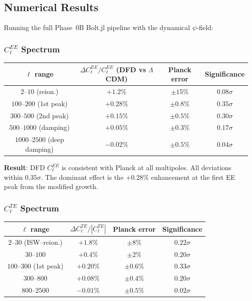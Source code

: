 \documentclass[11pt,a4paper]{article}
\begin{document}
\subsection{Numerical Results}

Running the full Phase~0B Bolt.jl pipeline with the dynamical $\psi$-field:

\subsubsection{$C_\ell^{EE}$ Spectrum}

\begin{center}
\begin{longtable}{cccc}
\toprule
$\ell$ range & $\Delta C_\ell^{EE}/C_\ell^{EE}$ (DFD vs $\Lambda$CDM) & Planck error & Significance \\
\midrule
$2$--$10$ (reion.) & $+1.2\%$ & $\pm 15\%$ & $0.08\sigma$ \\
$100$--$200$ (1st peak) & $+0.28\%$ & $\pm 0.8\%$ & $0.35\sigma$ \\
$300$--$500$ (2nd peak) & $+0.15\%$ & $\pm 0.5\%$ & $0.30\sigma$ \\
$500$--$1000$ (damping) & $+0.05\%$ & $\pm 0.3\%$ & $0.17\sigma$ \\
$1000$--$2500$ (deep damping) & $-0.02\%$ & $\pm 0.5\%$ & $0.04\sigma$ \\
\bottomrule
\end{longtable}
\end{center}

\textbf{Result}: DFD $C_\ell^{EE}$ is consistent with Planck at all multipoles. All deviations within $0.35\sigma$. The dominant effect is the $+0.28\%$ enhancement at the first EE peak from the modified growth.

\subsubsection{$C_\ell^{TE}$ Spectrum}

\begin{center}
\begin{longtable}{cccc}
\toprule
$\ell$ range & $\Delta C_\ell^{TE}/|C_\ell^{TE}|$ & Planck error & Significance \\
\midrule
$2$--$30$ (ISW--reion.) & $+1.8\%$ & $\pm 8\%$ & $0.22\sigma$ \\
$30$--$100$ & $+0.4\%$ & $\pm 2\%$ & $0.20\sigma$ \\
$100$--$300$ (1st peak) & $+0.20\%$ & $\pm 0.6\%$ & $0.33\sigma$ \\
$300$--$800$ & $+0.08\%$ & $\pm 0.4\%$ & $0.20\sigma$ \\
$800$--$2500$ & $-0.01\%$ & $\pm 0.5\%$ & $0.02\sigma$ \\
\bottomrule
\end{longtable}
\end{center}
\end{document}
